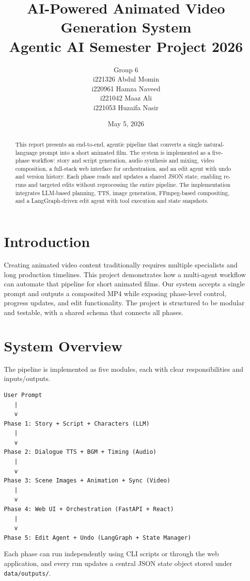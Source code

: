 \documentclass[11pt]{article}
\title{AI-Powered Animated Video Generation System\\Agentic AI Semester Project 2026}
\author{Group 6\\i221326 Abdul Momin\\i220961 Hamza Naveed\\i221042 Maaz Ali\\i221053 Huzaifa Nasir}
\date{May 5, 2026}
\begin{document}
\maketitle
\tableofcontents
\newpage

\begin{abstract}
This report presents an end-to-end, agentic pipeline that converts a single natural-language prompt into a short animated film. The system is implemented as a five-phase workflow: story and script generation, audio synthesis and mixing, video composition, a full-stack web interface for orchestration, and an edit agent with undo and version history. Each phase reads and updates a shared JSON state, enabling re-runs and targeted edits without reprocessing the entire pipeline. The implementation integrates LLM-based planning, TTS, image generation, FFmpeg-based compositing, and a LangGraph-driven edit agent with tool execution and state snapshots.
\end{abstract}

\section{Introduction}
Creating animated video content traditionally requires multiple specialists and long production timelines. This project demonstrates how a multi-agent workflow can automate that pipeline for short animated films. Our system accepts a single prompt and outputs a composited MP4 while exposing phase-level control, progress updates, and edit functionality. The project is structured to be modular and testable, with a shared schema that connects all phases.

\section{System Overview}
The pipeline is implemented as five modules, each with clear responsibilities and inputs/outputs.

\begin{lstlisting}
User Prompt
   |
   v
Phase 1: Story + Script + Characters (LLM)
   |
   v
Phase 2: Dialogue TTS + BGM + Timing (Audio)
   |
   v
Phase 3: Scene Images + Animation + Sync (Video)
   |
   v
Phase 4: Web UI + Orchestration (FastAPI + React)
   |
   v
Phase 5: Edit Agent + Undo (LangGraph + State Manager)
\end{lstlisting}

Each phase can run independently using CLI scripts or through the web application, and every run updates a central JSON state object stored under \texttt{data/outputs/}.
\end{document}
